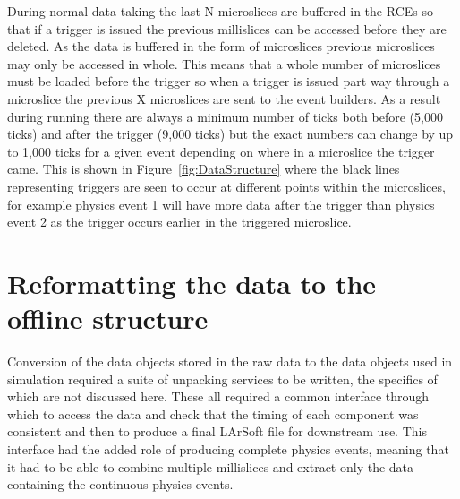 During normal data taking the last N microslices are buffered in the RCEs so that if a trigger is issued the previous millislices can be accessed before they are deleted. As the data is buffered in the form of microslices previous microslices may only be accessed in whole. This means that a whole number of microslices must be loaded before the trigger so when a trigger is issued part way through a microslice the previous X microslices are sent to the event builders. As a result during running there are always a minimum number of ticks both before (5,000 ticks) and after the trigger (9,000 ticks) but the exact numbers can change by up to 1,000 ticks for a given event depending on where in a microslice the trigger came. This is shown in Figure~\ref{fig:DataStructure} where the black lines representing triggers are seen to occur at different points within the microslices, for example physics event 1 will have more data after the trigger than physics event 2 as the trigger occurs earlier in the triggered microslice.

\section{Reformatting the data to the offline structure} \label{Reformatting the data to the offline structure} %
Conversion of the data objects stored in the raw data to the data objects used in simulation required a suite of unpacking services to be written, the specifics of which are not discussed here. These all required a common interface through which to access the data and check that the timing of each component was consistent and then to produce a final LArSoft file for downstream use. This interface had the added role of producing complete physics events, meaning that it had to be able to combine multiple millislices and extract only the data containing the continuous physics events. \\

